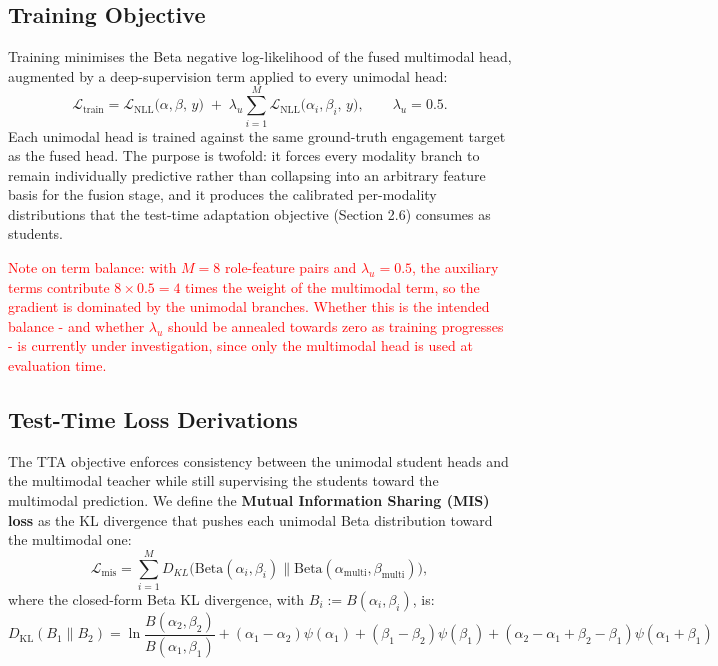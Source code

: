 \documentclass[11pt,a4paper]{article}
\begin{document}
	\subsection{Training Objective}
	
	Training minimises the Beta negative log-likelihood of the fused multimodal head, augmented by a deep-supervision term applied to every unimodal head:
	$$
	\mathcal{L}_{\text{train}} = \mathcal{L}_{\text{NLL}}\bigl(\alpha,\beta,\,y\bigr) \;+\; \lambda_u \sum_{i=1}^{M} \mathcal{L}_{\text{NLL}}\bigl(\alpha_i,\beta_i,\,y\bigr), \qquad \lambda_u = 0.5 .
	$$
	Each unimodal head is trained against the same ground-truth engagement target as the fused head. The purpose is twofold: it forces every modality branch to remain individually predictive rather than collapsing into an arbitrary feature basis for the fusion stage, and it produces the calibrated per-modality distributions that the test-time adaptation objective (Section 2.6) consumes as students.
	
	\textcolor{red}{Note on term balance: with $M = 8$ role-feature pairs and $\lambda_u = 0.5$, the auxiliary terms contribute $8 \times 0.5 = 4$ times the weight of the multimodal term, so the gradient is dominated by the unimodal branches. Whether this is the intended balance - and whether $\lambda_u$ should be annealed towards zero as training progresses - is currently under investigation, since only the multimodal head is used at evaluation time.}
	
	\subsection{Test-Time Loss Derivations}
	
	The TTA objective enforces consistency between the unimodal student heads and the multimodal teacher while still supervising the students toward the multimodal prediction. We define the \textbf{Mutual Information Sharing (MIS) loss} as the KL divergence that pushes each unimodal Beta distribution toward the multimodal one:
	$$
	\mathcal{L}_{\text{mis}} = \sum_{i=1}^M D_{KL} \bigl( \mathrm{Beta}(\alpha_i, \beta_i) \parallel \mathrm{Beta}(\alpha_{\text{multi}}, \beta_{\text{multi}}) \bigr),
	$$
	where the closed-form Beta KL divergence, with $ B_i := B(\alpha_i,\beta_i) $, is:
	\begin{equation}
		\label{eq:beta_kl}
		D_{\text{KL}}(B_1 \parallel B_2) = \ln \frac{B(\alpha_2,\beta_2)}{B(\alpha_1,\beta_1)} + (\alpha_1 - \alpha_2)\psi(\alpha_1) + (\beta_1 - \beta_2)\psi(\beta_1) + (\alpha_2 - \alpha_1 + \beta_2 - \beta_1)\psi(\alpha_1 + \beta_1)
	\end{equation}
	
\end{document}
